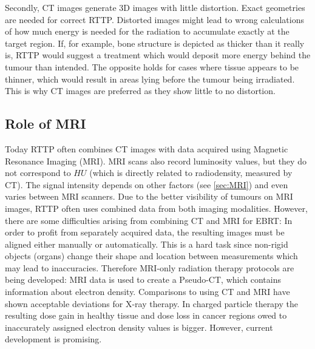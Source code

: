 Secondly, CT images generate 3D images with little distortion. Exact geometries are needed for correct RTTP.
Distorted images might lead to wrong calculations of how much energy is needed for the radiation to accumulate exactly at the target region.
If, for example, bone structure is depicted as thicker than it really is, RTTP would suggest a treatment which would deposit more energy behind the tumour than intended. The opposite holds for cases where tissue appears to be thinner, which would result in areas lying before the tumour being irradiated.
This is why CT images are preferred as they show little to no distortion.


\subsection{Role of MRI}
Today RTTP often combines CT images with data acquired using Magnetic Resonance Imaging (MRI).
MRI scans also record luminosity values, but they do not correspond to $HU$ (which is directly related to radiodensity, measured by CT).
The signal intensity depends on other factors (see \ref{sec:MRI}) and even varies between MRI scanners.
Due to the better visibility of tumours on MRI images, RTTP often uses combined data from both imaging modalities.
However, there are some difficulties arising from combining CT and MRI for EBRT:
In order to profit from separately acquired data, the resulting images must be aligned either manually or automatically. This is a hard task since non-rigid objects (organs) change their shape and location between measurements which may lead to inaccuracies.
Therefore MRI-only radiation therapy protocols are being developed:
MRI data is used to create a Pseudo-CT, which contains information about electron density. Comparisons to using CT and MRI have shown acceptable deviations for X-ray therapy.
In charged particle therapy the resulting dose gain in healthy tissue and dose loss in cancer regions owed to inaccurately assigned electron density values is bigger.
However, current development is promising. \cite{Rank2013, Stanescu2006, Nyholm2015, Greer2015, Chen2004}



